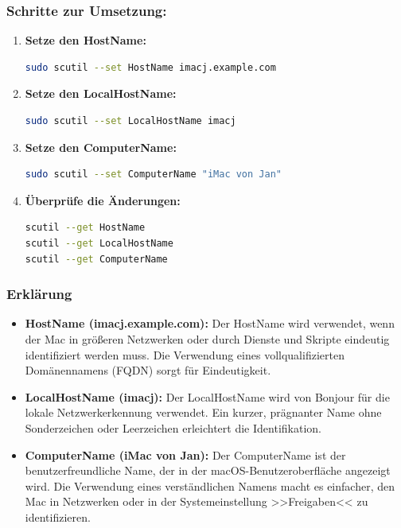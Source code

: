 \documentclass{vorlage-design-main}
\begin{document}
\subsubsection{Schritte zur Umsetzung:}\label{schritte-zur-umsetzung}

\begin{enumerate}
\def\labelenumi{\arabic{enumi}.}
\item
  \textbf{Setze den HostName:}

\begin{lstlisting}[language=bash]
sudo scutil --set HostName imacj.example.com
\end{lstlisting}
\item
  \textbf{Setze den LocalHostName:}

\begin{lstlisting}[language=bash]
sudo scutil --set LocalHostName imacj
\end{lstlisting}
\item
  \textbf{Setze den ComputerName:}

\begin{lstlisting}[language=bash]
sudo scutil --set ComputerName "iMac von Jan"
\end{lstlisting}
\item
  \textbf{Überprüfe die Änderungen:}

\begin{lstlisting}[language=bash]
scutil --get HostName
scutil --get LocalHostName
scutil --get ComputerName
\end{lstlisting}
\end{enumerate}

\subsubsection{Erklärung}\label{erklaerung}

\begin{itemize}

\item
  \textbf{HostName (imacj.example.com):} Der HostName wird verwendet,
  wenn der Mac in größeren Netzwerken oder durch Dienste und Skripte
  eindeutig identifiziert werden muss. Die Verwendung eines
  vollqualifizierten Domänennamens (FQDN) sorgt für Eindeutigkeit.
\item
  \textbf{LocalHostName (imacj):} Der LocalHostName wird von Bonjour für
  die lokale Netzwerkerkennung verwendet. Ein kurzer, prägnanter Name
  ohne Sonderzeichen oder Leerzeichen erleichtert die Identifikation.
\item
  \textbf{ComputerName (iMac von Jan):} Der ComputerName ist der
  benutzerfreundliche Name, der in der macOS-Benutzeroberfläche
  angezeigt wird. Die Verwendung eines verständlichen Namens macht es
  einfacher, den Mac in Netzwerken oder in der Systemeinstellung
  >>Freigaben<< zu identifizieren.
\end{itemize}
\end{document}
